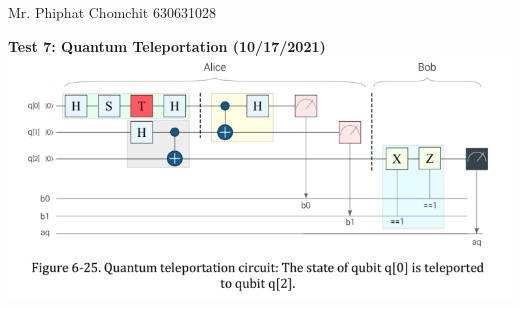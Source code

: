 \documentclass[12pt, a4paper]{article}
\begin{document}
	Mr. Phiphat Chomchit 630631028
	\begin{center}
		\textbf{Test 7: Quantum Teleportation (10/17/2021) }
			\includegraphics[scale=0.7]{problem.png}
	\end{center}

	\newpage
	
\end{document}
